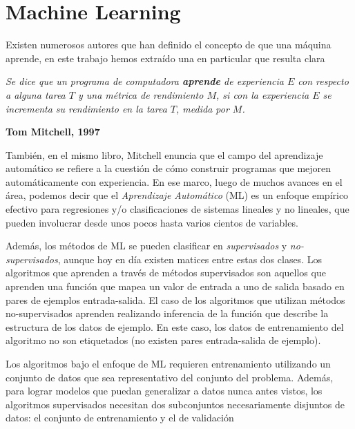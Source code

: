 


\justifying

\section{Machine Learning}

  \par Existen numerosos autores que han definido el concepto de que una máquina
    aprende, en este trabajo hemos extraído una en particular que resulta
    clara
    \begin{framed}
      \begin{center}
        \textit{Se dice que un programa de computadora \textbf{aprende} de experiencia
        $E$ con respecto a alguna tarea $T$ y una métrica de rendimiento $M$, si
        con la experiencia $E$ se incrementa su rendimiento en la tarea $T$,
        medida por $M$.}\\
      \end{center}
      \centering \textbf{Tom Mitchell, 1997} \cite{mitchell_learn}
    \end{framed}

    También, en el mismo libro, Mitchell enuncia que el campo del aprendizaje
    automático se refiere a la cuestión de cómo construir programas
    que mejoren automáticamente con experiencia.
    En ese marco, luego de muchos avances en el área, podemos decir que el
    \textit{Aprendizaje Automático} (ML) es un
    enfoque empírico efectivo para regresiones y/o clasificaciones de sistemas
    lineales y no lineales, que pueden involucrar desde unos pocos hasta varios
    cientos de variables.

  \par Además, los métodos de ML se pueden clasificar en
    \textit{supervisados}\cite{supervised_learning} y
    \textit{no-supervisados}\cite{unsupervised_learning}, aunque hoy en día
    existen matices entre estas dos clases\cite{semi_supervised}.
    Los algoritmos que aprenden a través de métodos supervisados son aquellos que
    aprenden una función que mapea un valor de entrada a uno de salida basado
    en pares de ejemplos entrada-salida.
    El caso de los algoritmos que utilizan métodos no-supervisados aprenden
    realizando inferencia de la función que describe la estructura de los datos
    de ejemplo. En este caso, los datos de entrenamiento del algoritmo no son
    etiquetados (no existen pares entrada-salida de ejemplo).

  \par Los algoritmos bajo el enfoque de ML requieren entrenamiento utilizando un
    conjunto de datos que sea representativo del conjunto del problema.
    Además, para lograr modelos que puedan generalizar a datos nunca antes vistos,
    los algoritmos supervisados necesitan dos subconjuntos necesariamente
    disjuntos de datos: el conjunto de entrenamiento y el de validación\cite{test_val}


